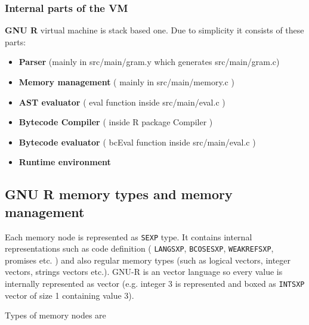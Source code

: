 \documentclass[thesis=M,english]{FITthesis}[2018/10/20]
\newcommand{\code}[1]{\texttt{#1}}
\begin{document}
\subsubsection{Internal parts of the VM}\label{internal-parts-of-vm}

\textbf{GNU R} virtual machine is stack based one. Due to simplicity it consists of these parts:
\begin{itemize}
	\item \textbf{Parser} (mainly in src/main/gram.y which generates src/main/gram.c)
	\item \textbf{Memory management} ( mainly in src/main/memory.c )
	\item \textbf{AST evaluator} ( eval function inside src/main/eval.c )
	\item \textbf{Bytecode Compiler} ( inside R package Compiler )
	\item \textbf{Bytecode evaluator} ( bcEval function inside src/main/eval.c )
	\item \textbf{Runtime environment}
\end{itemize}

\subsection{GNU R memory types and memory management}\label{memory-management}

Each memory node is represented as \code{SEXP} type. It contains internal representations such as code definition ( \code{LANGSXP}, \code{BCOSESXP}, \code{WEAKREFSXP}, promises etc. ) and also regular memory types (such as logical vectors, integer vectors, strings vectors etc.). GNU-R is an vector language so every value is internally represented as vector (e.g. integer 3 is represented and boxed as \code{INTSXP} vector of size 1 containing value 3).

Types of memory nodes are
\end{document}
